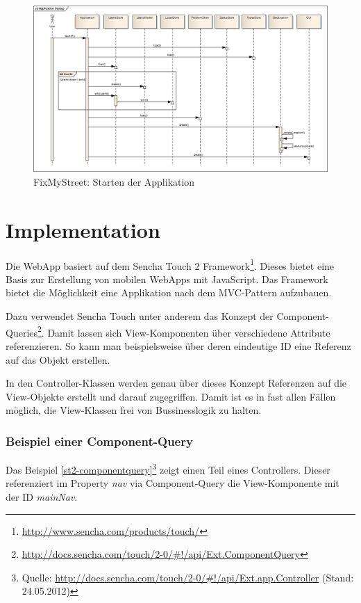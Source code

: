 \begin{figure}[H]
	\centering
	\includegraphics[width=\textwidth]{images/usecase2-fixmystreet/uml/fixmystreet-sequencediagram-applicationstartup}
	\caption{FixMyStreet: Starten der Applikation}
	\label{fixmystreet-sequencediagram-applicationstartup}
\end{figure}

\section{Implementation}
Die \gls{WebApp} basiert auf dem Sencha Touch 2 Framework\footnote{\url{http://www.sencha.com/products/touch/}}. Dieses bietet eine Basis zur Erstellung von mobilen \gls{WebApp}s mit JavaScript. Das Framework bietet die Möglichkeit eine Applikation nach dem \gls{MVC}-Pattern aufzubauen.

Dazu verwendet Sencha Touch unter anderem das Konzept der Component-Queries\footnote{\url{http://docs.sencha.com/touch/2-0/\#!/api/Ext.ComponentQuery}}. Damit lassen sich View-Komponenten über verschiedene Attribute referenzieren. So kann man beispielsweise über deren eindeutige ID eine Referenz auf das Objekt erstellen.

In den Controller-Klassen werden genau über dieses Konzept Referenzen auf die View-Objekte erstellt und darauf zugegriffen. Damit ist es in fast allen Fällen möglich, die View-Klassen frei von Bussinesslogik zu halten.

\subsubsection{Beispiel einer Component-Query}
Das Beispiel \ref{st2-componentquery}\footnote{Quelle: \url{http://docs.sencha.com/touch/2-0/\#!/api/Ext.app.Controller} (Stand: 24.05.2012)} zeigt einen Teil eines Controllers. Dieser referenziert im Property \emph{nav} via Component-Query die View-Komponente mit der ID \emph{mainNav}.


